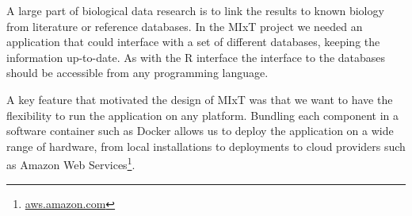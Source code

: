 A large part of biological data research is to link the results to known biology
from literature or reference databases. In the MIxT project we needed an
application that could interface with a set of different databases, keeping the
information up-to-date. As with the R interface the interface to the databases
should be accessible from any programming language. 

A key feature that motivated the design of MIxT was that we want to
have the flexibility to run the application on any platform. Bundling each
component in a software container such as Docker allows us to deploy the
application on a wide range of hardware, from local installations to deployments
to cloud providers such as Amazon Web Services\footnote{\url{aws.amazon.com}}.




